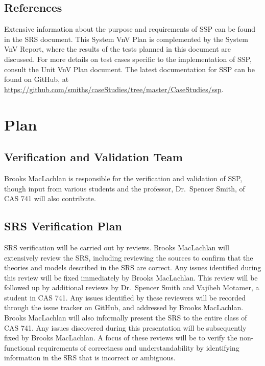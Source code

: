 \documentclass[12pt, titlepage]{article}
\newcommand{\progname}{SSP}
\begin{document}
\subsection{References}

\noindent Extensive information about the purpose and requirements of 
\progname{} can be found in the SRS document. This System VnV Plan is 
complemented by the System VnV Report, where the results of the tests planned 
in this document are discussed. For more details on test cases specific to the 
implementation of \progname{}, consult the Unit VnV Plan document. The latest 
documentation for \progname{} can be found on GitHub, at \newline 
\href{https://github.com/smiths/caseStudies/tree/master/CaseStudies/ssp}{https://github.com/smiths/caseStudies/tree/master/CaseStudies/ssp}.

\section{Plan} \label{sec_Plan}
	
\subsection{Verification and Validation Team}

\noindent Brooks MacLachlan is responsible for the verification and validation 
of \progname{}, though input from various students and the professor, 
Dr.~Spencer Smith, of CAS 741 will also contribute.



\subsection{SRS Verification Plan}

\noindent SRS verification will be carried out by reviews. Brooks MacLachlan 
will extensively review the SRS, including reviewing the sources to confirm 
that the theories and models described in the SRS are correct. Any issues 
identified during this review will be fixed immediately by Brooks MacLachlan. 
This review will be followed up by additional reviews by Dr.~Spencer Smith and 
Vajiheh Motamer, a student in CAS 741. Any issues identified by these reviewers 
will be recorded through the issue tracker on GitHub, and addressed by Brooks 
MacLachlan. Brooks MacLachlan will also informally present the SRS to the 
entire class of CAS 741. Any issues discovered during this presentation will be 
subsequently fixed by Brooks MacLachlan. A focus of these reviews will be to 
verify the non-functional requirements of correctness and understandability by 
identifying information in the SRS that is incorrect or ambiguous.
\end{document}

